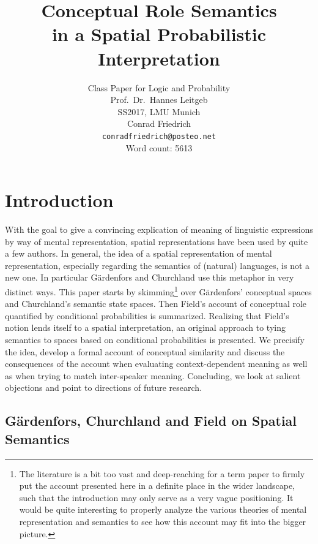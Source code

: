 \documentclass[11pt, a4paper]{scrartcl}
\title{\osfamily{}Conceptual Role Semantics \\ in a Spatial Probabilistic Interpretation}
\author{Class Paper for Logic and Probability \\ Prof.\ Dr.\ Hannes Leitgeb \\ SS2017, LMU Munich \\ Conrad Friedrich \\ \texttt{conradfriedrich@posteo.net} \\ Word count: {\color{red} 5613}}
\begin{document}
\maketitle
\thispagestyle{empty}
\tableofcontents

\section{Introduction}

With the goal to give a convincing explication of meaning of linguistic expressions by way of mental representation, spatial representations have been used by quite a few authors. In general, the idea of a spatial representation of mental representation, especially regarding the semantics of (natural) languages, is not a new one. In particular Gärdenfors and Churchland use this metaphor in very distinct ways. This paper starts by skimming\footnote{The literature is a bit too vast and deep-reaching for a term paper to firmly put the account presented here in a definite place in the wider landscape, such that the introduction may only serve as a very vague positioning. It would be quite interesting to properly analyze the various theories of mental representation and semantics to see how this account may fit into the bigger picture.} over Gärdenfors' conceptual spaces and Churchland's semantic state spaces. Then Field's account of conceptual role quantified by conditional probabilities is summarized. Realizing that Field's notion lends itself to a spatial interpretation, an original approach to tying semantics to spaces based on conditional probabilities is presented. We precisify the idea, develop a formal account of conceptual similarity and discuss the consequences of the account when evaluating context-dependent meaning as well as when trying to match inter-speaker meaning. Concluding, we look at salient objections and point to directions of future research.  

\subsection{Gärdenfors, Churchland and Field on Spatial Semantics}
\end{document}
